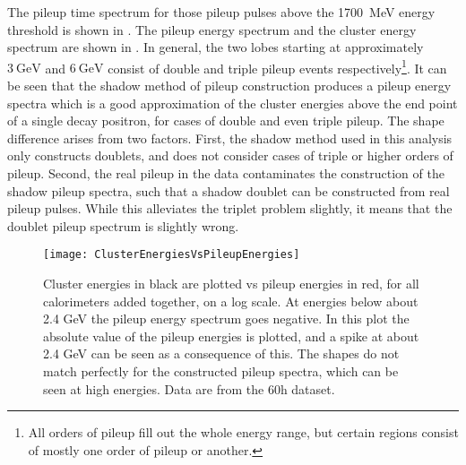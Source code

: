 The pileup time spectrum for those pileup pulses above the \SI{1700}{\MeV} energy threshold is shown in . The pileup energy spectrum and the cluster energy spectrum are shown in . In general, the two lobes starting at approximately $\SI{3}{\GeV}$ and $\SI{6}{\GeV}$ consist of double and triple pileup events respectively\footnote{All orders of pileup fill out the whole energy range, but certain regions consist of mostly one order of pileup or another.}. It can be seen that the shadow method of pileup construction produces a pileup energy spectra which is a good approximation of the cluster energies above the end point of a single decay positron, for cases of double and even triple pileup. The shape difference arises from two factors. First, the shadow method used in this analysis only constructs doublets, and does not consider cases of triple or higher orders of pileup. Second, the real pileup in the data contaminates the construction of the shadow pileup spectra, such that a shadow doublet can be constructed from real pileup pulses. While this alleviates the triplet problem slightly, it means that the doublet pileup spectrum is slightly wrong. 



    \begin{figure}
        \centering
        \texttt{[image: ClusterEnergiesVsPileupEnergies]}
        \caption[Cluster energies vs pileup energies]{Cluster energies in black are plotted vs pileup energies in red, for all calorimeters added together, on a log scale. At energies below about 2.4 GeV the pileup energy spectrum goes negative. In this plot the absolute value of the pileup energies is plotted, and a spike at about 2.4 GeV can be seen as a consequence of this. The shapes do not match perfectly for the constructed pileup spectra, which can be seen at high energies. Data are from the 60h dataset.}    
        \label{fig:ClusterEnergiesVsPileupEnergies}
    \end{figure}




